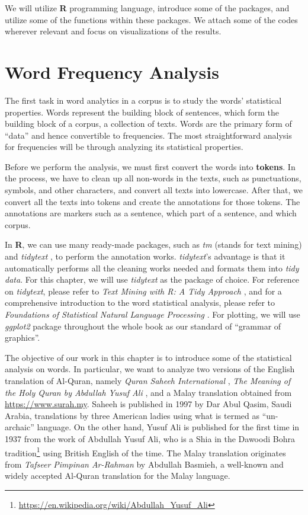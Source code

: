 \documentclass[
]{article}
\begin{document}
We will utilize \textbf{R} programming language, introduce some of the packages, and utilize some of the functions within these packages. We attach some of the codes wherever relevant and focus on visualizations of the results.

\hypertarget{word-frequency-analysis}{%
\section{Word Frequency Analysis}\label{word-frequency-analysis}}

The first task in word analytics in a corpus is to study the words' statistical properties. Words represent the building block of sentences, which form the building block of a corpus, a collection of texts. Words are the primary form of ``data'' and hence convertible to frequencies. The most straightforward analysis for frequencies will be through analyzing its statistical properties.

Before we perform the analysis, we must first convert the words into \textbf{tokens}. In the process, we have to clean up all non-words in the texts, such as punctuations, symbols, and other characters, and convert all texts into lowercase. After that, we convert all the texts into tokens and create the annotations for those tokens. The annotations are markers such as a sentence, which part of a sentence, and which corpus.

In \textbf{R}, we can use many ready-made packages, such as \emph{tm} \citep{tm} (stands for text mining) and \emph{tidytext} \citep{tidytext}, to perform the annotation works. \emph{tidytext}'s advantage is that it automatically performs all the cleaning works needed and formats them into \emph{tidy data}. For this chapter, we will use \emph{tidytext} as the package of choice. For reference on \emph{tidytext}, please refer to \emph{Text Mining with R: A Tidy Approach} \citep{silge2017}, and for a comprehensive introduction to the word statistical analysis, please refer to \emph{Foundations of Statistical Natural Language Processing} \citep{manning1999}. For plotting, we will use \emph{ggplot2} \citep{ggplot2} package throughout the whole book as our standard of ``grammar of graphics''.

The objective of our work in this chapter is to introduce some of the statistical analysis on words. In particular, we want to analyze two versions of the English translation of Al-Quran, namely \emph{Quran Saheeh International} \citep{saheeh1997}, \emph{The Meaning of the Holy Quran by Abdullah Yusuf Ali} \citep{yusufali2003}, and a Malay translation obtained from \url{https://www.surah.my}. Saheeh is published in 1997 by Dar Abul Qasim, Saudi Arabia, translations by three American ladies using what is termed as ``un-archaic'' language. On the other hand, Yusuf Ali is published for the first time in 1937 from the work of Abdullah Yusuf Ali, who is a Shia in the Dawoodi Bohra tradition\footnote{\url{https://en.wikipedia.org/wiki/Abdullah_Yusuf_Ali}} using British English of the time. The Malay translation originates from \emph{Tafseer Pimpinan Ar-Rahman} by Abdullah Basmieh, a well-known and widely accepted Al-Quran translation for the Malay language.
\end{document}

